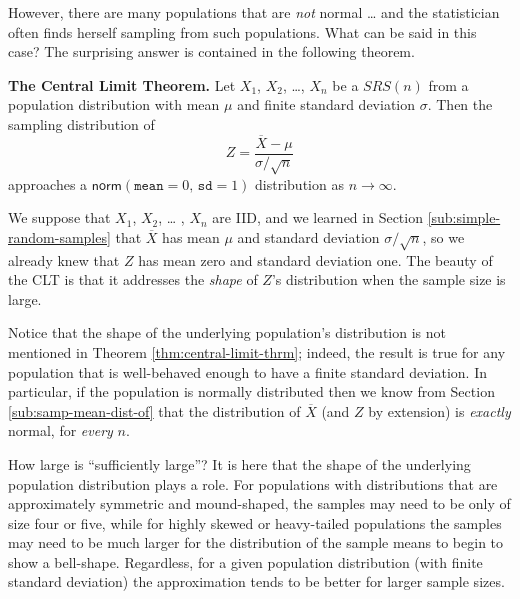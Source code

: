 \documentclass[captions=tableheading]{scrbook}
\begin{document}
However, there are many populations that are \emph{not} normal \ldots{} and the statistician often finds herself sampling from such populations. What can be said in this case? The surprising answer is contained in the following theorem.

\begin{thm}
\label{thm:central-limit-thrm}
\textbf{The Central Limit Theorem.} Let \(X_{1}\), \(X_{2}\), \ldots{}, \(X_{n}\) be a \(SRS(n)\) from a population distribution with mean \(\mu\) and finite standard deviation \(\sigma\). Then the sampling distribution of 
\begin{equation}
Z=\frac{\overline{X}-\mu}{\sigma/\sqrt{n}}
\end{equation}
approaches a \(\mathsf{norm}(\mathtt{mean}=0,\,\mathtt{sd}=1)\) distribution as \(n\to\infty\).
\end{thm}

\begin{rem}
We suppose that \(X_{1}\), \(X_{2}\), \ldots{} , \(X_{n}\) are IID, and we learned in Section \ref{sub:simple-random-samples} that \(\overline{X}\) has mean \(\mu\) and standard deviation \(\sigma/\sqrt{n}\), so we already knew that \(Z\) has mean zero and standard deviation one. The beauty of the CLT is that it addresses the \emph{shape} of \(Z\)'s distribution when the sample size is large.
\end{rem}

\begin{rem}
Notice that the shape of the underlying population's distribution is not mentioned in Theorem \ref{thm:central-limit-thrm}; indeed, the result is true for any population that is well-behaved enough to have a finite standard deviation. In particular, if the population is normally distributed then we know from Section \ref{sub:samp-mean-dist-of} that the distribution of \(\overline{X}\) (and \(Z\) by extension) is \emph{exactly} normal, for \emph{every} \(n\).
\end{rem}

\begin{rem}
How large is ``sufficiently large''? It is here that the shape of the underlying population distribution plays a role. For populations with distributions that are approximately symmetric and mound-shaped, the samples may need to be only of size four or five, while for highly skewed or heavy-tailed populations the samples may need to be much larger for the distribution of the sample means to begin to show a bell-shape. Regardless, for a given population distribution (with finite standard deviation) the approximation tends to be better for larger sample sizes.
\end{rem}
\end{document}
